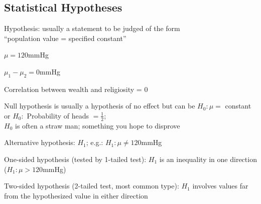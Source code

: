 \subsection{Statistical Hypotheses}
\bi
\item Hypothesis: usually a statement to be judged of the form \\
  ``population value = specified constant''
 \bi
 \item $\mu = 120$mmHg
 \item $\mu_{1} - \mu_{2} = 0$mmHg
 \item Correlation between wealth and religiosity = 0
 \ei
\item Null hypothesis is usually a hypothesis of no effect but can be
 $H_{0}: \mu =$ constant or $H_{0}:$ Probability of heads
 $=\frac{1}{2}$; \\
 $H_{0}$ is often a straw man; something you hope to disprove
\item Alternative hypothesis: $H_1$; e.g.: $H_{1}: \mu \neq 120$mmHg
\item One-sided hypothesis (tested by 1-tailed test): $H_{1}$ is an
  inequality in one direction ($H_{1}: \mu > 120$mmHg)
\item Two-sided hypothesis (2-tailed test, most common type): $H_{1}$
  involves values far from the hypothesized value in either direction
\ei

